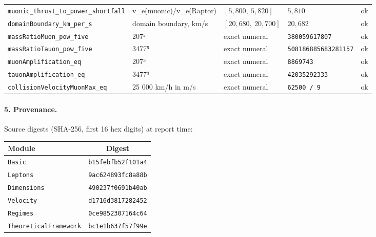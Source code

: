\documentclass[11pt,a4paper]{article}
\begin{document}
{\begin{longtable}{@{}p{}p{}p{}p{}p{}@{}}
\texttt{\scriptsize muonic\_\allowbreak{}thrust\_\allowbreak{}to\_\allowbreak{}power\_\allowbreak{}shortfall} & v\_\allowbreak{}e(muonic)/v\_\allowbreak{}e(Raptor) & $[5{,}800,\ 5{,}820]$ & $5{,}810$ & \textcolor{okgreen}{ok} \\
\texttt{\scriptsize domainBoundary\_\allowbreak{}km\_\allowbreak{}per\_\allowbreak{}s} & domain boundary, km/s & $[20{,}680,\ 20{,}700]$ & $20{,}682$ & \textcolor{okgreen}{ok} \\
\texttt{\scriptsize massRatioMuon\_\allowbreak{}pow\_\allowbreak{}five} & 207⁵ & exact numeral & \texttt{380059617807} & \textcolor{okgreen}{ok} \\
\texttt{\scriptsize massRatioTauon\_\allowbreak{}pow\_\allowbreak{}five} & 3477⁵ & exact numeral & \texttt{508186885683281157} & \textcolor{okgreen}{ok} \\
\texttt{\scriptsize muonAmplification\_\allowbreak{}eq} & 207³ & exact numeral & \texttt{8869743} & \textcolor{okgreen}{ok} \\
\texttt{\scriptsize tauonAmplification\_\allowbreak{}eq} & 3477³ & exact numeral & \texttt{42035292333} & \textcolor{okgreen}{ok} \\
\texttt{\scriptsize collisionVelocityMuonMax\_\allowbreak{}eq} & 25 000 km/h in m/s & exact numeral & \texttt{62500 / 9} & \textcolor{okgreen}{ok} \\
\bottomrule
\end{longtable}
}

\paragraph{5. Provenance.}
Source digests (SHA-256, first 16 hex digits) at report time:

\begin{center}\small
\begin{tabular}{@{}lc@{}}
\toprule
Module & Digest \\
\midrule
\texttt{Basic} & \texttt{b15febfb52f101a4} \\
\texttt{Leptons} & \texttt{9ac624893fc8a88b} \\
\texttt{Dimensions} & \texttt{490237f0691b40ab} \\
\texttt{Velocity} & \texttt{d1716d3817282452} \\
\texttt{Regimes} & \texttt{0ce9852307164c64} \\
\texttt{TheoreticalFramework} & \texttt{bc1e1b637f57f99e} \\
\bottomrule
\end{tabular}
\end{center}
\end{document}
